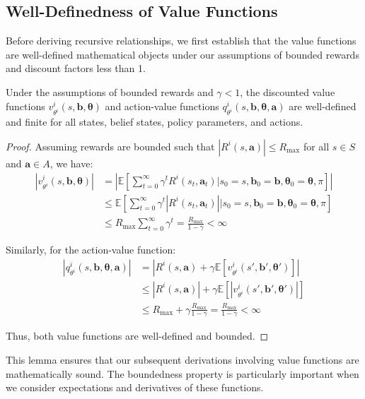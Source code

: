 \subsection{Well-Definedness of Value Functions}
Before deriving recursive relationships, we first establish that the value functions
are well-defined mathematical objects under our assumptions of bounded rewards and
discount factors less than 1.
\begin{lemma}
    Under the assumptions of bounded rewards and $\gamma < 1$, the discounted
    value functions $v^{i}_{\theta^i}(s, \boldsymbol{b}, \boldsymbol{\theta})$ and
    action-value functions
    $q^{i}_{\theta^i}(s, \boldsymbol{b}, \boldsymbol{\theta}, \boldsymbol{a})$ are
    well-defined and finite for all states, belief states, policy parameters, and actions.
\end{lemma}
\begin{proof}
    Assuming rewards are bounded such that $|R^{i}(s, \boldsymbol{a})| \leq R_{\max}$
    for all $s \in S$ and $\boldsymbol{a}\in A$, we have:
    \begin{align}
        |v^{i}_{\theta^i}(s, \boldsymbol{b}, \boldsymbol{\theta})| & = \left| \mathbb{E}\left[ \sum_{t=0}^{\infty}\gamma^{t} R^{i}(s_{t}, \boldsymbol{a}_{t}) \bigg| s_{0}=s, \boldsymbol{b}_{0}=\boldsymbol{b}, \boldsymbol{\theta}_{0}=\boldsymbol{\theta}, \pi \right] \right| \\
                                                                   & \leq \mathbb{E}\left[ \sum_{t=0}^{\infty}\gamma^{t} |R^{i}(s_{t}, \boldsymbol{a}_{t})| \bigg| s_{0}=s, \boldsymbol{b}_{0}=\boldsymbol{b}, \boldsymbol{\theta}_{0}=\boldsymbol{\theta}, \pi \right]           \\
                                                                   & \leq R_{\max}\sum_{t=0}^{\infty}\gamma^{t} = \frac{R_{\max}}{1-\gamma}< \infty
    \end{align}

    Similarly, for the action-value function:
    \begin{align}
        |q^{i}_{\theta^i}(s, \boldsymbol{b}, \boldsymbol{\theta}, \boldsymbol{a})| & = \left| R^{i}(s, \boldsymbol{a}) + \gamma \mathbb{E}[v^{i}_{\theta^i}(s', \boldsymbol{b}', \boldsymbol{\theta}')] \right| \\
                                                                                   & \leq |R^{i}(s, \boldsymbol{a})| + \gamma \mathbb{E}[|v^{i}_{\theta^i}(s', \boldsymbol{b}', \boldsymbol{\theta}')|]         \\
                                                                                   & \leq R_{\max}+ \gamma \frac{R_{\max}}{1-\gamma}= \frac{R_{\max}}{1-\gamma}< \infty
    \end{align}

    Thus, both value functions are well-defined and bounded.
\end{proof}This lemma ensures that our subsequent derivations involving value
functions are mathematically sound. The boundedness property is particularly important
when we consider expectations and derivatives of these functions.
